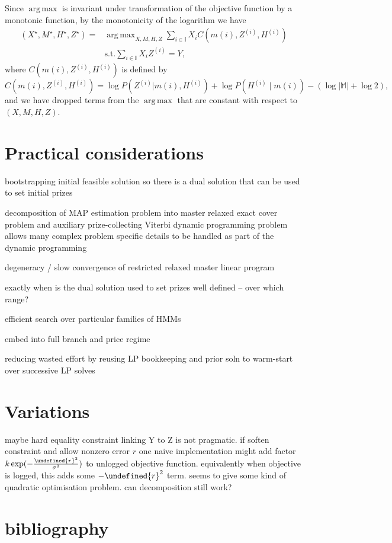 \documentclass[twoside, 11pt]{article}
\let\norm\undefined
\DeclarePairedDelimiter\norm{\lVert}{\rVert}
\newcommand{\mm}[0] {\mathbb{M}} %
\newcommand{\II}[0] {\mathbb{I}} %
\newcommand{\traj}[1] {H^{(#1)}}
\newcommand{\eventseq}[1] {Z^{(#1)}}
\DeclareMathOperator*{\argmax}{arg\,max}
\begin{document}
Since $\argmax$ is invariant under transformation of the objective function by a monotonic function, by the monotonicity of the logarithm we have
\begin{align}
(X^{\star}, M^{\star}, H^{\star}, Z^{\star})
= & \argmax_{X, M, H, Z} \sum_{i \in \II} X_i C(m(i), \eventseq i, \traj i) \\
 & \mathrm{s.t.} \sum_{i \in \II} X_i \eventseq i = Y ,
\end{align}
where $C(m(i), \eventseq i, \traj i)$ is defined by
\begin{equation*}
C(m(i), \eventseq i, \traj i) =
\log P\left(\eventseq i | m(i), \traj i\right) + 
\log P(\traj i \mid m(i)) -
\left ( \log |\mm| + \log 2 \right) ,
\end{equation*}
and we have dropped terms from the $\argmax$ that are constant
with respect to $(X, M, H, Z)$.


\section{Practical considerations}

{bootstrapping initial feasible solution so there is a dual solution that can be used to set initial prizes}

{decomposition of MAP estimation problem into master relaxed exact cover problem and auxiliary prize-collecting Viterbi dynamic programming problem allows many complex problem specific details to be handled as part of the dynamic programming}

{degeneracy / slow convergence of restricted relaxed master linear program}

{exactly when is the dual solution used to set prizes well defined -- over which range?}

{efficient search over particular families of HMMs}

{embed into full branch and price regime}

{reducing wasted effort by reusing LP bookkeeping and prior soln to warm-start over successive LP solves}

\section{Variations}

{maybe hard equality constraint linking Y to Z is not pragmatic. if soften constraint and allow nonzero error $r$ one naive implementation might add factor $k \exp(-\frac{\norm{r}^2}{{\sigma^2}})$ to unlogged objective function. equivalently when objective is logged, this adds some $- \norm{r}^2$ term. seems to give some kind of quadratic optimisation problem. can decomposition still work?}

\section{bibliography}
\end{document}
